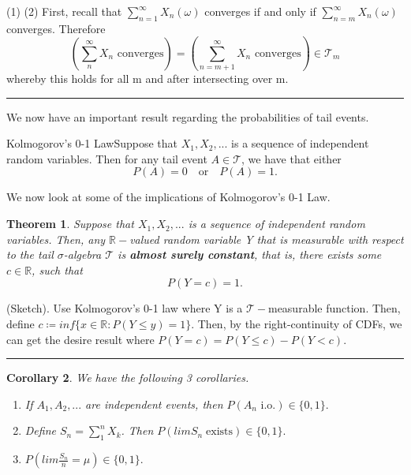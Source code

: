 \documentclass[twoside]{article}
\newcounter{lecnum}
\newtheorem{theorem}{Theorem}[lecnum]
\newtheorem{corollary}[theorem]{Corollary}
\newenvironment{proof}{{\bf Proof:}}{\hfill\rule{2mm}{2mm}}
\begin{document}
\begin{proof} (1)
\newline
(2) First, recall that $\sum_{n=1}^{\infty}X_n(\omega)$ converges if and only if $\sum_{n=m}^{\infty}X_n(\omega)$ converges. Therefore 
$$
(\sum_{n}^{\infty}X_n \text{ converges}) = (\sum_{n = m+1}^{\infty}X_n \text{ converges}) \in \mathcal{T}_m
$$
whereby this holds for all m and after intersecting over m.
\end{proof}


We now have an important result regarding the probabilities of tail events.

\begin{theorem_exam}{Kolmogorov's 0-1 Law}{}Suppose that $X_1,X_2,...$ is a sequence of independent random variables. Then for any tail event $A \in \mathcal{T}$, we have that either 
$$
P(A) = 0 \quad \text{or} \quad P(A) = 1.
$$
\end{theorem_exam}

We now look at some of the implications of Kolmogorov’s 0-1 Law.

\begin{theorem}Suppose that $X_1,X_2,...$ is a sequence of independent random variables. Then, any $\mathbb{R}-$valued random variable Y that is measurable with respect to the tail $\sigma$-algebra $\mathcal{T}$ is \textbf{almost surely constant}, that is, there exists some $c \in \mathbb{R}$, such that
$$
P(Y = c) = 1.
$$
\end{theorem}

\begin{proof}(Sketch). Use Kolmogorov’s 0-1 law where Y is a $\mathcal{T}-$measurable function. Then, define $c \coloneqq inf\{x \in \mathbb{R}: P(Y \leq y) = 1\}.$ Then, by the right-continuity of CDFs, we can get the desire result where $P(Y = c) = P(Y \leq c) - P(Y < c).$
\end{proof}

\begin{corollary}We have the following 3 corollaries.
\begin{enumerate}
\item If $A_1,A_2,...$ are independent events, then $P(A_n \text{ i.o.}) \in \{0,1\}.$
\item Define $S_n = \sum_{1}^{n}X_k$. Then $P(lim  S_n\;\text{exists}) \in \{0,1\}.$
\item $P(lim \frac{S_n}{n} = \mu) \in \{0,1\}.$
\end{enumerate}
\end{corollary}
\end{document}
